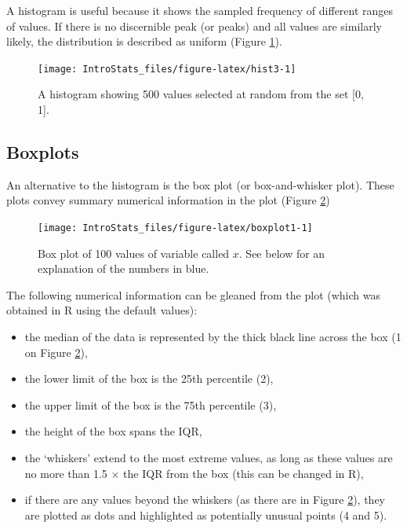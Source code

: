 \documentclass[
  oneside]{krantz}
\begin{document}
A histogram is useful because it shows the sampled frequency of different ranges of values. If there is no discernible peak (or peaks) and all values are similarly likely, the distribution is described as uniform (Figure \ref{fig:hist3}).

\begin{figure}

{\centering \texttt{[image: IntroStats\_files/figure-latex/hist3-1]} 

}

\caption{A histogram showing 500 values selected at random from the set [0, 1].}\label{fig:hist3}
\end{figure}

\hypertarget{boxplots}{%
\subsection{Boxplots}\label{boxplots}}

An alternative to the histogram is the box plot (or box-and-whisker plot). These plots convey summary numerical information in the plot (Figure \ref{fig:boxplot1})

\begin{figure}

{\centering \texttt{[image: IntroStats\_files/figure-latex/boxplot1-1]} 

}

\caption{Box plot of 100 values of variable called $x$. See below for an explanation of the numbers in blue.}\label{fig:boxplot1}
\end{figure}

The following numerical information can be gleaned from the plot (which was obtained in R using the default values):

\begin{itemize}
\item
  the median of the data is represented by the thick black line across the box (\color{blue}1 \color{black} on Figure \ref{fig:boxplot1}),
\item
  the lower limit of the box is the 25th percentile (\color{blue}2\color{black}),
\item
  the upper limit of the box is the 75th percentile (\color{blue}3\color{black}),
\item
  the height of the box spans the IQR,
\item
  the `whiskers' extend to the most extreme values, as long as these values are no more than 1.5 \(\times\) the IQR from the box (this can be changed in R),
\item
  if there are any values beyond the whiskers (as there are in Figure \ref{fig:boxplot1}), they are plotted as dots and highlighted as potentially unusual points (\color{blue}4 \color{black} and \color{blue}5\color{black}).
\end{itemize}
\end{document}
